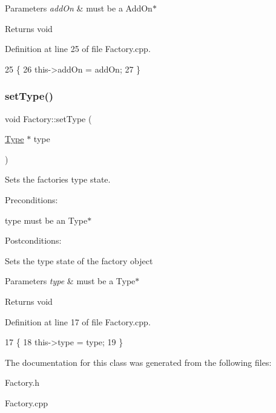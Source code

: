 \begin{DoxyParams}{Parameters}
{\em add\+On} & must be a Add\+On$\ast$ \\
\hline
\end{DoxyParams}
\begin{DoxyReturn}{Returns}
void 
\end{DoxyReturn}


Definition at line 25 of file Factory.\+cpp.


\begin{DoxyCode}
25                                     \{
26     this->addOn = addOn;
27 \}
\end{DoxyCode}
\mbox{\label{classFactory_a7484d514b094114231dbeb3df70e9d0b}} 
\subsubsection{\texorpdfstring{set\+Type()}{setType()}}
{\footnotesize\ttfamily void Factory\+::set\+Type (\begin{DoxyParamCaption}\item[{\hyperlink{classType}{Type} $\ast$}]{type }\end{DoxyParamCaption})}



Sets the factories type state. 

Preconditions\+:
\begin{DoxyItemize}
\item type must be an Type$\ast$
\end{DoxyItemize}

Postconditions\+:
\begin{DoxyItemize}
\item Sets the type state of the factory object
\end{DoxyItemize}


\begin{DoxyParams}{Parameters}
{\em type} & must be a Type$\ast$ \\
\hline
\end{DoxyParams}
\begin{DoxyReturn}{Returns}
void 
\end{DoxyReturn}


Definition at line 17 of file Factory.\+cpp.


\begin{DoxyCode}
17                                 \{
18     this->type = type;
19 \}
\end{DoxyCode}


The documentation for this class was generated from the following files\+:\begin{DoxyCompactItemize}
\item 
Factory.\+h\item 
Factory.\+cpp\end{DoxyCompactItemize}
